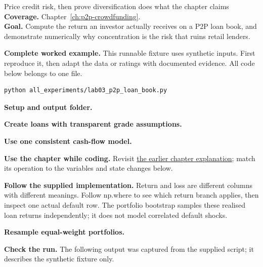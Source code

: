 
\begin{labproject}{Price credit risk, then prove diversification does what the chapter claims}
\textbf{Coverage.} Chapter~\ref{ch:p2p-crowdfunding}.\\
\textbf{Goal.} Compute the return an investor actually receives on a P2P loan book, and demonstrate numerically why concentration is the risk that ruins retail lenders.




\end{labproject}

\textbf{Complete worked example.} This runnable fixture uses synthetic inputs. First reproduce it, then adapt the data or ratings with documented evidence. All code below belongs to one file.
\begin{lstlisting}[style=utpterminal]
python all_experiments/lab03_p2p_loan_book.py
\end{lstlisting}

\noindent\textbf{Setup and output folder.}


\noindent\textbf{Create loans with transparent grade assumptions.}


\noindent\textbf{Use one consistent cash-flow model.}



\textbf{Use the chapter while coding.} Revisit \hyperref[ch:p2p-crowdfunding]{the earlier chapter explanation}; match its operation to the variables and state changes below.

\textbf{Follow the supplied implementation.} Return and loss are different columns with different meanings. Follow np.where to see which return branch applies, then inspect one actual default row. The portfolio bootstrap samples these realised loan returns independently; it does not model correlated default shocks.




\noindent\textbf{Resample equal-weight portfolios.}


\textbf{Check the run.} The following output was captured from the supplied script; it describes the synthetic fixture only.



